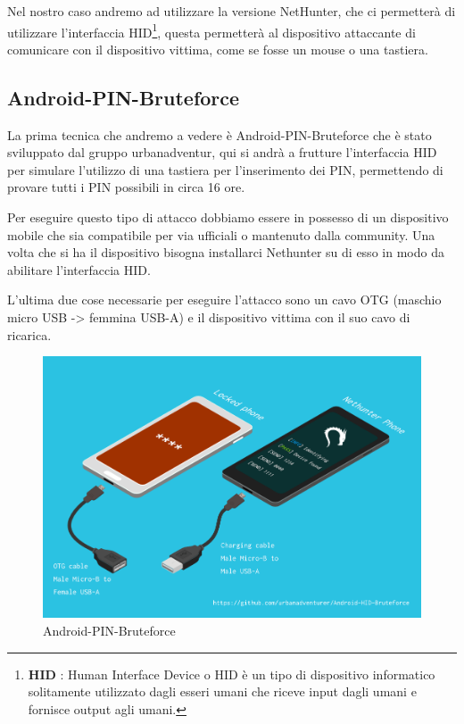\newpage

Nel nostro caso andremo ad utilizzare la versione NetHunter, che ci permetterà di utilizzare l'interfaccia HID\footnote[1]{\textbf{HID} : Human Interface Device o HID è un tipo di dispositivo informatico solitamente utilizzato dagli esseri umani che riceve input dagli umani e fornisce output agli umani.}, questa permetterà al dispositivo attaccante di comunicare con il dispositivo vittima, come se fosse un mouse o una tastiera.

\subsection{Android-PIN-Bruteforce}

La prima tecnica che andremo a vedere è Android-PIN-Bruteforce\cite{Android-PIN-Bruteforce} che è stato sviluppato dal gruppo urbanadventur, qui si andrà a frutture l’interfaccia HID per simulare l’utilizzo di una tastiera per l’inserimento dei PIN, permettendo di provare tutti i PIN possibili in circa 16 ore.

Per eseguire questo tipo di attacco dobbiamo essere in possesso di un dispositivo mobile che sia compatibile per via ufficiali\cite{nethunter_official} o mantenuto dalla community\cite{nethunter_community}. Una volta che si ha il dispositivo bisogna installarci Nethunter su di esso in modo da abilitare l'interfaccia HID.

L'ultima due cose necessarie per eseguire l'attacco sono un cavo OTG (maschio micro USB  -> femmina USB-A) e il dispositivo vittima con il suo cavo di ricarica.

\begin{figure}[h!]
    \centering
    \includegraphics[width=140mm]{Immagini/3/pin_brute_1.png}
    \caption{Android-PIN-Bruteforce}
    \label{fig:Android-PIN-Bruteforce}
\end{figure}

